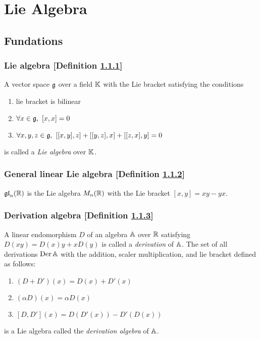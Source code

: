 \newcommand{\gl}{\g{gl}}
\renewcommand{\sl}{\g{sl}}
\renewcommand{\o}{\g{o}}
\section{Lie Algebra}
\subsection{Fundations}
\subsubsection{Lie algebra [Definition \ref{lie-algebra}]}\label{lie-algebra}
A vector space $\mathfrak{g}$ over a field $\mathbb{K}$ with the Lie bracket satisfying the conditions
\begin{enumerate}[label=\roman*)]
\item lie bracket is bilinear
\item $\forall x \in \mathfrak{g},\ [x,x] = 0$
\item $\forall x, y, z \in \g g,\ [[x,y],z]+[[y,z],x]+[[z,x],y] = 0$
\end{enumerate}
is called a \textit{Lie algebra} over $\mathbb{K}$.

\subsubsection{General linear Lie algebra [Definition \ref{general-linear-lie-algebra}]}\label{general-linear-lie-algebra}
$\mathfrak{gl}_n(\mathbb{R})$ is the Lie algebra $M_n(\mathbb{R})$ with the Lie bracket $[x,y] = xy - yx$.

\subsubsection{Derivation algebra [Definition \ref{derivation-algebra}]}\label{derivation-algebra}
A linear endomorphism $D$ of an algebra $\mathbb{A}$ over $\mathbb{R}$ satisfying $D(xy) = D(x)y + xD(y)$ is called a \textit{derivation} of $\mathbb{A}$. The set of all derivations $\mathrm{Der}\, \mathbb{A}$ with the addition, scaler multiplication, and lie bracket defined as follows:
\begin{enumerate}[label=\roman*)]
\item $(D+D')(x) = D(x)+D'(x)$
\item $(\alpha D)(x) = \alpha D(x)$
\item $[D,D'](x) = D(D'(x)) - D'(D(x))$  
\end{enumerate}
is a Lie algebra called the \textit{derivation algebra} of $\mathbb{A}$.

